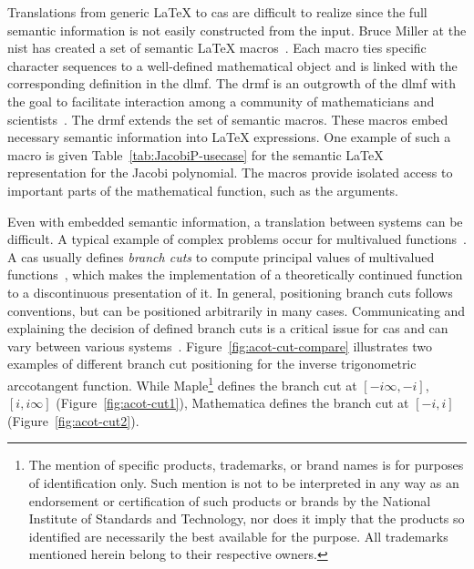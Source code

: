 \documentclass[a4paper,11pt]{article}
\newcommand{\Maple}{Maple}
\newcommand{\Mathematica}{Mathematica}
\theoremstyle{defTheoStyle}
\theoremstyle{defExampStyle}
\DeclareRobustCommand{\iunit}{{i}}
\begin{document}
Translations from generic \LaTeX{} to \gls*{cas} are difficult to realize since the full semantic information is not easily constructed from the input. Bruce Miller at the \gls*{nist} has created a set of semantic \LaTeX{} macros~\parencite{DLMF:Macros}. Each macro ties specific character sequences to a well-defined mathematical object and is linked with the corresponding definition in the \gls*{dlmf}. The \gls*{drmf} is an outgrowth of the \gls*{dlmf} with the goal to facilitate interaction among a community of mathematicians and scientists~\parencites{DRMF:14}{DRMF:15}. The \gls*{drmf} extends the set of semantic macros. These macros embed necessary semantic information into \LaTeX{} expressions. One example of such a macro is given Table~\ref{tab:JacobiP-usecase} for the semantic \LaTeX{} representation for the Jacobi polynomial. The macros provide isolated access to important parts of the mathematical function, such as the arguments. 

Even with embedded semantic information, a translation between systems can be difficult. A typical example of complex problems occur for multivalued functions~\parencite{AISC:MultivaluedFunctions}. A \gls*{cas} usually defines \textit{branch cuts} to compute principal values of multivalued functions~\parencite{Maple:Cuts}, which makes the implementation of a theoretically continued function to a discontinuous presentation of it. In general, positioning branch cuts follows conventions, but can be positioned arbitrarily in many cases. Communicating and explaining the decision of defined branch cuts is a critical issue for \gls*{cas} and can vary between various systems~\parencite{Branches:acot}. Figure~\ref{fig:acot-cut-compare} illustrates two examples of different branch cut positioning for the inverse trigonometric arccotangent function. While \Maple{}\footnote{The mention of
specific products, trademarks, or brand
names is for purposes of identification only. Such mention is not to be interpreted
in any way as an endorsement or certification of such products or brands by the
National Institute of Standards and Technology, nor does it imply that the products
so identified are necessarily the best available for the purpose. All trademarks
mentioned herein belong to their respective owners.} defines the branch cut at ${[-\iunit\infty, -\iunit]}$, ${[\iunit,\iunit\infty]}$ (Figure~\ref{fig:acot-cut1}), \Mathematica{} defines the branch cut at ${[-\iunit, \iunit]}$ (Figure~\ref{fig:acot-cut2}).
\end{document}

